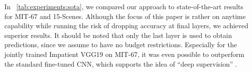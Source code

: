 \documentclass{bmvc2k}
\begin{document}
    In \tablename~\ref{tab:experiments:sota}, we compared our approach to state-of-the-art results for MIT-67 and 15-Scenes.
    Although the focus of this paper is rather on anytime capability while running the risk of dropping accuracy at final layers, we achieved superior results.
    It should be noted that only the last layer is used to obtain predictions, since we assume to have no budget restrictions.
    Especially for the jointly trained Impatient VGG19 on MIT-67, it was even possible to outperform the standard fine-tuned CNN, which supports the idea of ``deep supervision'' \cite{wang2015training}.


    \begin{table}[tb]
        \centering
\end{table}
\end{document}
